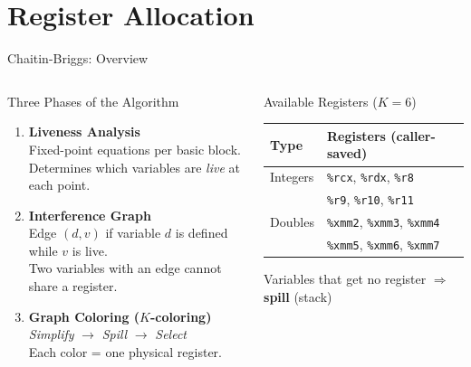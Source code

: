 \documentclass[aspectratio=169,11pt]{beamer}
\newcommand{\reg}[1]{\texttt{\%#1}}
\begin{document}
\section{Register Allocation}

\begin{frame}{Chaitin-Briggs: Overview}
\begin{columns}[c]
  \begin{block}{Three Phases of the Algorithm}
    \medskip
    \begin{enumerate}\normalsize\itemsep8pt
      \item \textbf{Liveness Analysis}\\
        \small Fixed-point equations per basic block.\\
        Determines which variables are \emph{live} at each point.

      \item \textbf{Interference Graph}\\
        \small Edge $(d, v)$ if variable $d$ is defined while $v$ is live.\\
        Two variables with an edge cannot share a register.

      \item \textbf{Graph Coloring ($K$-coloring)}\\
        \small \emph{Simplify} $\to$ \emph{Spill} $\to$ \emph{Select}\\
        Each color = one physical register.
    \end{enumerate}
    \medskip
  \end{block}

  \begin{exampleblock}{Available Registers ($K = 6$)}
    \medskip
    \begin{center}
    \begin{tabular}{ll}
      \toprule
      \textbf{Type} & \textbf{Registers (caller-saved)} \\
      \midrule
      Integers & \reg{rcx}, \reg{rdx}, \reg{r8} \\
               & \reg{r9}, \reg{r10}, \reg{r11} \\[4pt]
      Doubles  & \reg{xmm2}, \reg{xmm3}, \reg{xmm4} \\
               & \reg{xmm5}, \reg{xmm6}, \reg{xmm7} \\
      \bottomrule
    \end{tabular}
    \end{center}
    \medskip
    Variables that get no register $\Rightarrow$ \textbf{spill} (stack)
  \end{exampleblock}
\end{columns}
\end{frame}
\end{document}
